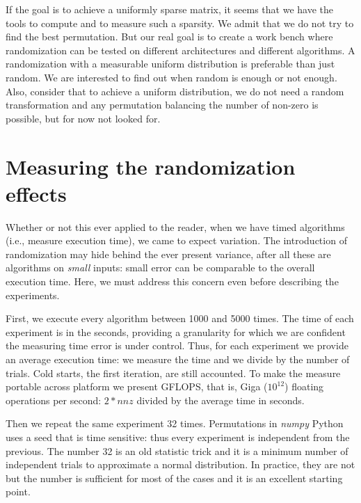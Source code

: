 \documentclass[manuscript,screen]{acmart}
\begin{document}

If the goal is to achieve a uniformly sparse matrix, it seems that we
have the tools to compute and to measure such a sparsity. We admit
that we do not try to find the best permutation. But our real goal is
to create a work bench where randomization can be tested on different
architectures and different algorithms. A randomization with a
measurable uniform distribution is preferable than just random. We are
interested to find out when random is enough or not enough. Also,
consider that to achieve a uniform distribution, we do not need a
random transformation and any permutation balancing the number of
non-zero is possible, but for now not looked for.

\section{Measuring the randomization effects}
\label{sec:measuring}

Whether or not this ever applied to the reader, when we have timed
algorithms (i.e., measure execution time), we came to expect
variation.  The introduction of randomization may hide behind the ever
present variance, after all these are algorithms on {\em small}
inputs: small error can be comparable to the overall execution
time. Here, we must address this concern even before describing the
experiments.

First, we execute every algorithm between 1000 and 5000 times. The
time of each experiment is in the seconds, providing a granularity for
which we are confident the measuring time error is under
control. Thus, for each experiment we provide an average execution
time: we measure the time and we divide by the number of trials. Cold
starts, the first iteration, are still accounted. To make the measure
portable across platform we present GFLOPS, that is, Giga ($10^{12}$)
floating operations per second: $2*nnz$ divided by the average time in
seconds. 

Then we repeat the same experiment 32 times. Permutations in {\em
  numpy} Python uses a seed that is time sensitive: thus every
experiment is independent from the previous. The number 32 is an old
statistic trick and it is a minimum number of independent trials to
approximate a normal distribution. In practice, they are not but the
number is sufficient for most of the cases and it is an excellent
starting point.
\end{document}
